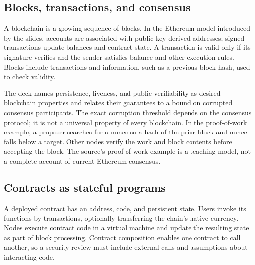 \documentclass[11pt,a4paper]{article}
\numberwithin{figure}{section}
\begin{document}
\subsection{Blocks, transactions, and consensus}
A blockchain is a growing sequence of blocks. In the Ethereum model introduced by the slides, accounts are associated with public-key-derived addresses; signed transactions update balances and contract state. A transaction is valid only if its signature verifies and the sender satisfies balance and other execution rules. Blocks include transactions and information, such as a previous-block hash, used to check validity.

The deck names persistence, liveness, and public verifiability as desired blockchain properties and relates their guarantees to a bound on corrupted consensus participants. The exact corruption threshold depends on the consensus protocol; it is not a universal property of every blockchain. In the proof-of-work example, a proposer searches for a nonce so a hash of the prior block and nonce falls below a target. Other nodes verify the work and block contents before accepting the block. The source's proof-of-work example is a teaching model, not a complete account of current Ethereum consensus.

\subsection{Contracts as stateful programs}
A deployed contract has an address, code, and persistent state. Users invoke its functions by transactions, optionally transferring the chain's native currency. Nodes execute contract code in a virtual machine and update the resulting state as part of block processing. Contract composition enables one contract to call another, so a security review must include external calls and assumptions about interacting code.
\end{document}
